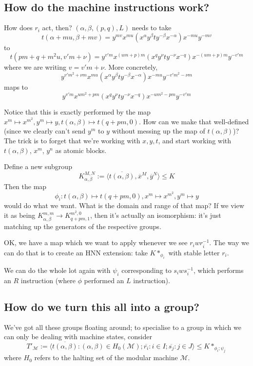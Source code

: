 \documentclass[11pt]{amsart}
\theoremstyle{remark}
\begin{document}
\subsection{How do the machine instructions work?}

How does $r_i$ act, then?
$(\alpha, \beta, (p,q), L)$ needs to take $$t(\alpha + m u, \beta + m v) = y^{mv}x^{mu} (x^{\alpha} y^{\beta} t y^{-\beta} x^{-\alpha}) x^{-m u} y^{-m v}$$
to $$t(pm+q+m^2u, v'm + \nu) = y^{v'm} x^{(um+p)m}(x^{q} y{^\nu} t y^{-\nu} x^{-q}) x^{-(um+p) m} y^{-v' m}$$
where we are writing $v = v'm + \nu$.
More concretely,
$$y^{v'm^2+\nu m} x^{m u}(x^{\alpha} y^{\beta} t y^{-\beta} x^{-\alpha}) x^{-m u} y^{-v'm^2-\nu m}$$
maps to $$y^{v' m} x^{um^2+pm}(x^{q} y{^\nu} t y^{-\nu} x^{-q}) x^{-um^2-p m} y^{-v' m}$$

Notice that this is exactly performed by the map $x^m \mapsto x^{m^2}, y^m \mapsto y, t(\alpha, \beta) \mapsto t(q+p m, 0)$.
How can we make that well-defined (since we clearly can't send $y^m$ to $y$ without messing up the map of $t(\alpha, \beta)$)?
The trick is to forget that we're working with $x,y,t$, and start working with $t(\alpha, \beta)$, $x^m$, $y^n$ as atomic blocks.

Define a new subgroup $$K_{\alpha, \beta}^{M, N} := \langle \overline{t(\alpha, \beta)}, \overline{x}^M, \overline{y}^N \rangle \leq K$$
Then the map $$\phi_i: t(\alpha,\beta) \mapsto t(q+pm, 0), x^m \mapsto x^{m^2}, y^m \mapsto y$$
would do what we want.
What is the domain and range of that map?
If we view it as being $K_{\alpha, \beta}^{m,m} \to K_{q+pm, 1}^{m^2, 0}$, then it's actually an isomorphism:
it's just matching up the generators of the respective groups.

OK, we have a map which we want to apply whenever we see $r_i w r_i^{-1}$.
The way we can do that is to create an HNN extension:
take $K *_{\phi_i}$ with stable letter $r_i$.

We can do the whole lot again with $\psi_i$ corresponding to $s_i w s_i^{-1}$, which performs an $R$ instruction (where $\phi$ performed an $L$ instruction).

\subsection{How do we turn this all into a group?}

We've got all these groups floating around; to specialise to a group in which we can only be dealing with machine states,
consider $$T'_{\mathcal{M}} := \langle \overline{t(\alpha, \beta)}: (\alpha, \beta) \in H_0(\mathcal{M}); \overline{r_i}: i \in I; \overline{s_j}: j \in J \rangle \leq K *_{\phi_i; \psi_j}$$
where $H_0$ refers to the halting set of the modular machine $\mathcal{M}$.
\end{document}
